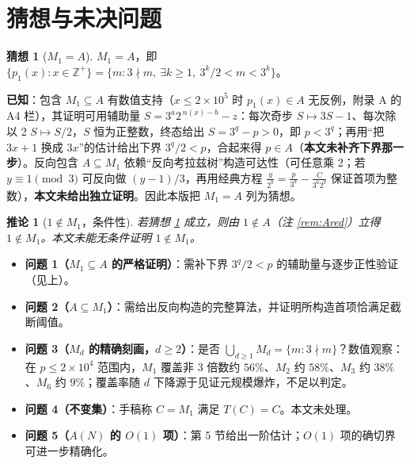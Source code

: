 \documentclass[11pt]{article}
\newtheorem{corollary}[theorem]{推论}
\theoremstyle{definition}\newtheorem{definition}[theorem]{定义}
\theoremstyle{definition}\newtheorem{conjecture}[theorem]{猜想}
\theoremstyle{remark}\newtheorem{remark}[theorem]{注}
\begin{document}
\section{猜想与未决问题}
\begin{conjecture}[$M_1=A$]\label{conj:M1A}
$M_1=A$，即 $\{p_1(x):x\in\mathbb{Z}^+\}=\{m:3\nmid m,\ \exists k\ge1,\ 3^k/2<m<3^k\}$。
\end{conjecture}
\textbf{已知}：包含 $M_1\subseteq A$ 有数值支持（$x\le2\times10^5$ 时 $p_1(x)\in A$ 无反例，附录 A 的 A4 栏），其证明可用辅助量 $S=3^a2^{\,n(x)-b}-z$：每次奇步 $S\mapsto3S-1$、每次除以 2 $S\mapsto S/2$，$S$ 恒为正整数，终态给出 $S=3^{q}-p>0$，即 $p<3^q$；再用“把 $3x+1$ 换成 $3x$”的估计给出下界 $3^q/2<p$，合起来得 $p\in A$（\textbf{本文未补齐下界那一步}）。反向包含 $A\subseteq M_1$ 依赖“反向考拉兹树”构造可达性（可任意乘 2；若 $y\equiv1\pmod3$ 可反向做 $(y-1)/3$，再用经典方程 $\frac{y}{2^b}=\frac{p}{3^a}-\frac{C}{3^a2^b}$ 保证首项为整数），\textbf{本文未给出独立证明}。因此本版把 $M_1=A$ 列为猜想。
\begin{corollary}[$1\notin M_1$，条件性]\label{cor:notinM1}
若猜想 \ref{conj:M1A} 成立，则由 $1\notin A$（注 \ref{rem:Ared}）立得 $1\notin M_1$。本文未能无条件证明 $1\notin M_1$。
\end{corollary}
\begin{itemize}\item \textbf{问题 1（$M_1\subseteq A$ 的严格证明）}：需补下界 $3^q/2<p$ 的辅助量与逐步正性验证（见上）。\item \textbf{问题 2（$A\subseteq M_1$）}：需给出反向构造的完整算法，并证明所构造首项恰满足截断阈值。\item \textbf{问题 3（$M_d$ 的精确刻画，$d\ge2$）}：是否 $\bigcup_{d\ge1}M_d=\{m:3\nmid m\}$？数值观察：在 $p\le2\times10^4$ 范围内，$M_1$ 覆盖非 3 倍数约 $56\%$、$M_2$ 约 $58\%$、$M_3$ 约 $38\%$、$M_6$ 约 $9\%$；覆盖率随 $d$ 下降源于见证元规模爆炸，不足以判定。\item \textbf{问题 4（不变集）}：手稿称 $C=M_1$ 满足 $T(C)=C$。本文未处理。\item \textbf{问题 5（$A(N)$ 的 $O(1)$ 项）}：第 5 节给出一阶估计；$O(1)$ 项的确切界可进一步精确化。\end{itemize}
\appendix
{}
\end{document}
